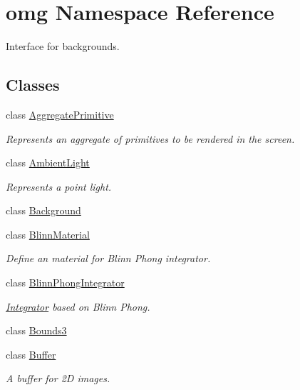 \hypertarget{namespaceomg}{}\section{omg Namespace Reference}
\label{namespaceomg}


Interface for backgrounds.  


\subsection*{Classes}
\begin{DoxyCompactItemize}
\item 
class \mbox{\hyperlink{classomg_1_1_aggregate_primitive}{Aggregate\+Primitive}}
\begin{DoxyCompactList}\small\item\em Represents an aggregate of primitives to be rendered in the screen. \end{DoxyCompactList}\item 
class \mbox{\hyperlink{classomg_1_1_ambient_light}{Ambient\+Light}}
\begin{DoxyCompactList}\small\item\em Represents a point light. \end{DoxyCompactList}\item 
class \mbox{\hyperlink{classomg_1_1_background}{Background}}
\item 
class \mbox{\hyperlink{classomg_1_1_blinn_material}{Blinn\+Material}}
\begin{DoxyCompactList}\small\item\em Define an material for Blinn Phong integrator. \end{DoxyCompactList}\item 
class \mbox{\hyperlink{classomg_1_1_blinn_phong_integrator}{Blinn\+Phong\+Integrator}}
\begin{DoxyCompactList}\small\item\em \mbox{\hyperlink{classomg_1_1_integrator}{Integrator}} based on Blinn Phong. \end{DoxyCompactList}\item 
class \mbox{\hyperlink{classomg_1_1_bounds3}{Bounds3}}
\item 
class \mbox{\hyperlink{classomg_1_1_buffer}{Buffer}}
\begin{DoxyCompactList}\small\item\em A buffer for 2D images. \end{DoxyCompactList}\item 

\end{DoxyCompactItemize}
